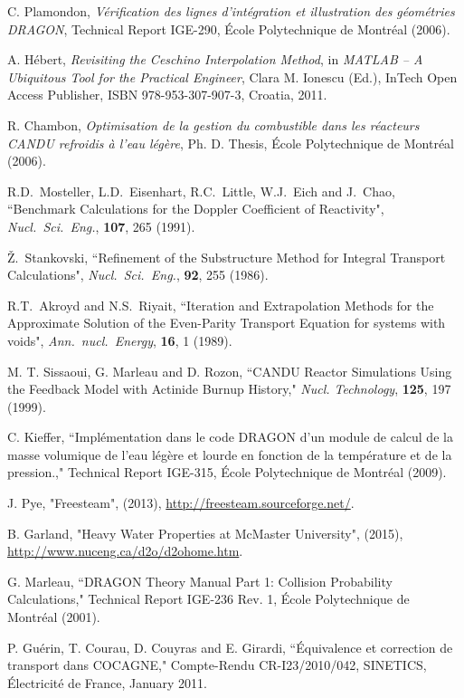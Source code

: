 \begin{thebibliography}{99}
C. Plamondon, {\sl V\'erification des lignes d'int\'egration et illustration des g\'eom\'etries DRAGON}, Technical Report 
IGE-290, \'Ecole Polytechnique de Montr\'eal (2006). 

A. H\'ebert, {\sl Revisiting the Ceschino Interpolation Method}, in {\sl MATLAB -- A Ubiquitous Tool for the Practical
Engineer}, Clara M. Ionescu (Ed.), InTech Open Access Publisher, ISBN 978-953-307-907-3, Croatia, 2011.

R. Chambon, {\sl Optimisation de la gestion du combustible dans les r\'eacteurs
CANDU refroidis \`a l'eau l\'eg\`ere}, Ph. D. Thesis, \'Ecole Polytechnique de Montr\'eal (2006). 

R.D.~Mosteller, L.D.~Eisenhart, R.C.~Little, W.J.~Eich and J.~Chao, ``Benchmark
Calculations for the Doppler Coefficient of Reactivity", {\sl Nucl.~Sci.~Eng.},
{\bf 107}, 265 (1991).

\v{Z}.~Stankovski, ``Refinement of the Substructure Method for Integral
Transport Calculations", {\sl Nucl.~Sci.~Eng.}, {\bf 92}, 255 (1986).

R.T.~Akroyd and N.S.~Riyait, ``Iteration and Extrapolation Methods for the
Approximate Solution of the Even-Parity Transport Equation for systems with
voids", {\sl Ann.~nucl.~Energy}, {\bf 16}, 1 (1989).

M. T. Sissaoui, G. Marleau and D. Rozon, ``CANDU Reactor Simulations Using the
Feedback Model with Actinide Burnup History," {\sl Nucl. Technology}, {\bf 125},
197 (1999).

C. Kieffer, ``Impl\'{e}mentation dans le code DRAGON d'un module de calcul de la masse volumique de l'eau l\'{e}g\`{e}re et lourde en fonction de la temp\'{e}rature et de la pression.," Technical Report IGE-315, \'Ecole Polytechnique de Montr\'eal (2009).

J. Pye, "Freesteam", (2013),
  \url{http://freesteam.sourceforge.net/}.

B. Garland, "Heavy Water Properties at McMaster University", (2015), \url{http://www.nuceng.ca/d2o/d2ohome.htm}.
  
G. Marleau, ``DRAGON Theory Manual Part 1: Collision Probability Calculations," Technical Report IGE-236 
Rev. 1, \'Ecole Polytechnique de Montr\'eal (2001).

P. Gu\'erin, T. Courau, D. Couyras and E. Girardi, ``\'Equivalence et correction de transport dans COCAGNE," Compte-Rendu CR-I23/2010/042, SINETICS, \'Electricit\'e de France, January 2011.


\end{thebibliography}
